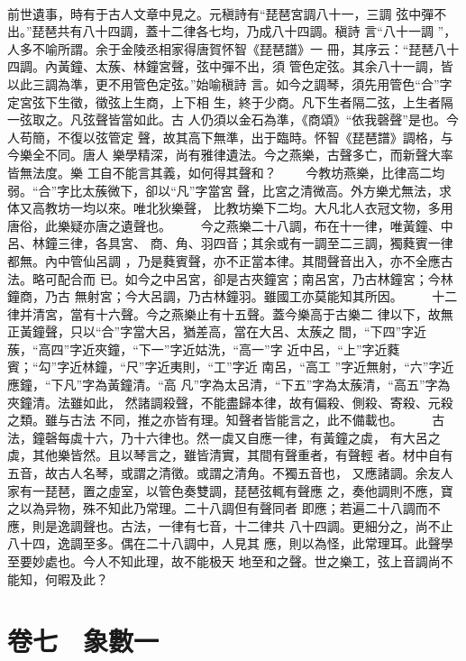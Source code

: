 \documentclass{ctexart}
\begin{document}
\paragraph{}
前世遺事，時有于古人文章中見之。元稹詩有``琵琶宮調八十一，三調 弦中彈不出。''琵琶共有八十四調，蓋十二律各七均，乃成八十四調。稹詩 言``八十一調 ''，人多不喻所謂。余于金陵丞相家得唐賀怀智《琵琶譜》一 冊，其序云：``琵琶八十四調。內黃鐘、太蔟、林鐘宮聲，弦中彈不出，須 管色定弦。其余八十一調，皆以此三調為準，更不用管色定弦。''始喻稹詩 言。如今之調琴，須先用管色``合''字定宮弦下生徵，徵弦上生商，上下相 生，終于少商。凡下生者隔二弦，上生者隔一弦取之。凡弦聲皆當如此。古 人仍須以金石為準，《商頌》``依我磬聲''是也。今人苟簡，不復以弦管定 聲，故其高下無準，出于臨時。怀智《琵琶譜》調格，与今樂全不同。唐人 樂學精深，尚有雅律遺法。今之燕樂，古聲多亡，而新聲大率皆無法度。樂 工自不能言其義，如何得其聲和？ 　　今教坊燕樂，比律高二均弱。``合''字比太蔟微下，卻以``凡''字當宮 聲，比宮之清微高。外方樂尤無法，求体又高教坊一均以來。唯北狄樂聲， 比教坊樂下二均。大凡北人衣冠文物，多用唐俗，此樂疑亦唐之遺聲也。 　　今之燕樂二十八調，布在十一律，唯黃鐘、中呂、林鐘三律，各具宮、 商、角、羽四音；其余或有一調至二三調，獨蕤賓一律都無。內中管仙呂調 ，乃是蕤賓聲，亦不正當本律。其間聲音出入，亦不全應古法。略可配合而 已。如今之中呂宮，卻是古夾鐘宮；南呂宮，乃古林鐘宮；今林鐘商，乃古 無射宮；今大呂調，乃古林鐘羽。雖國工亦莫能知其所因。 　　十二律并清宮，當有十六聲。今之燕樂止有十五聲。蓋今樂高于古樂二 律以下，故無正黃鐘聲，只以``合''字當大呂，猶差高，當在大呂、太蔟之 間，``下四''字近蔟，``高四''字近夾鐘，``下一''字近姑洗，``高一''字 近中呂，``上''字近蕤賓；``勾''字近林鐘，``尺''字近夷則，``工''字近 南呂，``高工 ''字近無射，``六''字近應鐘，``下凡''字為黃鐘清。``高 凡''字為太呂清，``下五''字為太蔟清，``高五''字為夾鐘清。法雖如此， 然諸調殺聲，不能盡歸本律，故有偏殺、側殺、寄殺、元殺之類。雖与古法 不同，推之亦皆有理。知聲者皆能言之，此不備載也。 　　古法，鐘磬每虡十六，乃十六律也。然一虡又自應一律，有黃鐘之虡， 有大呂之虡，其他樂皆然。且以琴言之，雖皆清實，其間有聲重者，有聲輕 者。材中自有五音，故古人名琴，或謂之清徵。或謂之清角。不獨五音也， 又應諸調。余友人家有一琵琶，置之虛室，以管色奏雙調，琵琶弦輒有聲應 之，奏他調則不應，寶之以為异物，殊不知此乃常理。二十八調但有聲同者 即應；若遍二十八調而不應，則是逸調聲也。古法，一律有七音，十二律共 八十四調。更細分之，尚不止八十四，逸調至多。偶在二十八調中，人見其 應，則以為怪，此常理耳。此聲學至要妙處也。今人不知此理，故不能极天 地至和之聲。世之樂工，弦上音調尚不能知，何暇及此？
\clearpage
\section{卷七　象數一}
\end{document}
